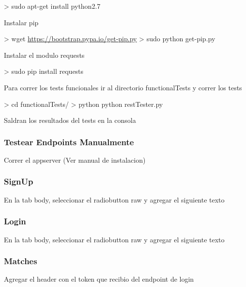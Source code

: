 \documentclass[letterpaper,10pt,english]{sphinxmanual}
\begin{document}
\textgreater{} sudo apt-get install python2.7

Instalar pip

\textgreater{} wget \href{https://bootstrap.pypa.io/get-pip.py}{https://bootstrap.pypa.io/get-pip.py}
\textgreater{} sudo python get-pip.py

Instalar el modulo requests

\textgreater{} sudo pip install requests

Para correr los tests funcionales ir al directorio functionalTests y correr los tests

\textgreater{} cd functionalTests/
\textgreater{} python python restTester.py

Saldran los resultados del tests en la consola


\subsubsection{Testear Endpoints Manualmente}
\label{manuals:testear-endpoints-manualmente}
Correr el appserver (Ver manual de instalacion)


\subsubsection{SignUp}
\label{manuals:id2}

En la tab body, seleccionar el radiobutton raw y agregar el siguiente texto



\subsubsection{Login}
\label{manuals:id3}

En la tab body, seleccionar el radiobutton raw y agregar el siguiente texto



\subsubsection{Matches}
\label{manuals:matches}

Agregar el header con el token que recibio del endpoint de login

\end{document}
